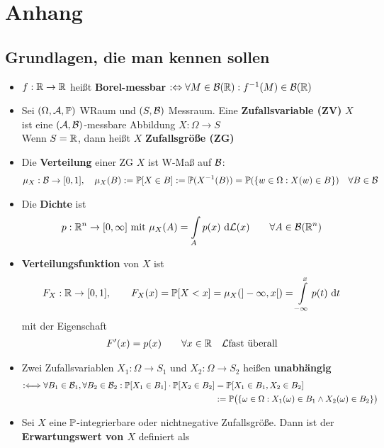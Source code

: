 \setcounter{chapter}{0}
\renewcommand{\thechapter}{\Alph{chapter}}
\chapter{Anhang}
\setcounter{equation}{1}
\section{Grundlagen, die man kennen sollen}
\begin{itemize}
\item $f:\R\to\R$ heißt \textbf{Borel-messbar} $:\gdw\forall M\in\B(\R):f^{-1}(M)\in\B(\R)$
\item Sei $(\Omega,\A, \P)$ WRaum und $(S,\B)$ Messraum. Eine \textbf{Zufallsvariable (ZV)} $X$ ist eine $(\A,\B)$-messbare Abbildung $X:\Omega\to S$\\
Wenn $S=\R$, dann heißt $X$ \textbf{Zufallsgröße (ZG)}
\item Die \textbf{Verteilung} einer ZG $X$ ist W-Maß auf $\B$:
\begin{align*}
\mu_X:\B\to[0,1],\quad
\mu_X(B):=\P[X\in B]:=\P(X^{-1}(B))=\P(\lbrace w\in\Omega:X(w)\in B\rbrace)\quad\forall B\in\B
\end{align*}
\item Die \textbf{Dichte} ist
\begin{align*}
p:\Rn\to[0,\infty]\mit \mu_X(A)=\int\limits_A p(x)\d\mathcal{L}(x)\qquad\forall A\in\B(\Rn)
\end{align*}
\item \textbf{Verteilungsfunktion} von $X$ ist
\begin{align*}
F_X:\R\to[0,1],\qquad F_X(x)=\P[X<x]=\mu_X(]-\infty,x[)=\int\limits_{-\infty}^x p(t)\d t
\end{align*}
mit der Eigenschaft
\begin{align*}
F'(x)=p(x)\qquad\forall x\in\R~~~\mathcal{L}\text{fast überall}
\end{align*}
\item Zwei Zufallsvariablen $X_1:\Omega\to S_1$ und $X_2:\Omega\to S_2$ heißen \textbf{unabhängig} 
\begin{align*}
:\Longleftrightarrow
\forall B_1\in\B_1,\forall B_2\in\B_2:
\P[X_1\in B_1]\cdot \P[X_2\in B_2]
&=
\P[X_1\in B_1, X_2\in B_2]\\
&:=\P\big(\lbrace\omega\in\Omega:X_1(\omega)\in B_1\wedge X_2(\omega)\in B_2\rbrace\big)
\end{align*}
\item Sei $X$ eine $\P$-integrierbare oder nichtnegative Zufallsgröße. Dann ist der \textbf{Erwartungswert von $X$} definiert als

\end{itemize}
